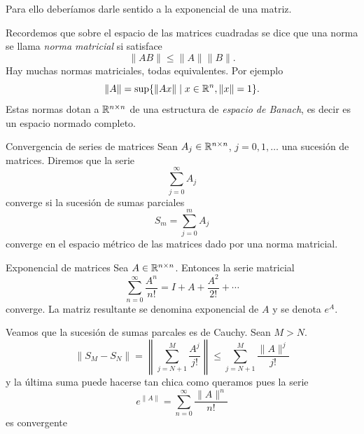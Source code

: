 Para ello deberíamos darle sentido a la exponencial de una matriz. 

Recordemos que sobre el espacio de las matrices cuadradas se dice que una norma se llama \emph{norma matricial} si satisface
\[    
  \|AB\|\leq \|A\|\|B\|.
\]
Hay muchas normas matriciales, todas equivalentes. Por ejemplo
\[
 \|A\|=\sup\{\|Ax\| \mid  x\in\mathbb{R}^n, \|x\|=1\}.
\]
Estas normas dotan a $\mathbb{R}^{n\times n}$ de una estructura de \emph{espacio de Banach}, es decir es un espacio normado completo. 



\begin{definicion}{Convergencia de series de matrices} Sean $A_j\in\mathbb{R}^{n\times n}$, $j=0,1,\ldots$ una sucesión de matrices. Diremos que la serie 
\[
 \sum_{j=0}^{\infty} A_j
\]
converge si la sucesión de sumas parciales
\[
 S_m=\sum_{j=0}^{m} A_j
\]
 converge en el espacio métrico de las matrices dado por una norma matricial. 
\end{definicion}


\begin{teorema}{Exponencial de matrices} Sea $A\in\mathbb{R}^{n\times n}$. Entonces  la serie matricial
\[
\sum_{n=0}^{\infty} \frac{A^n}{n!}=I+A+\frac{A^{2}}{2 !}+\cdots\]
converge. La matriz resultante se denomina exponencial de $A$ y se denota $e^A$.
\end{teorema}

\begin{demo} Veamos que la sucesión de sumas parcales es de Cauchy. Sean $M>N$. 
$$
\left\|S_{M}-S_{N}\right\|=\left\|\sum_{j=N+1}^{M} \frac{A^{j}}{j!}\right\| \leqslant \sum_{j=N+1}^{M} \frac{\| A \|^j}{j !}
$$
 y la última suma puede hacerse tan  chica como queramos pues la serie
 \[
  e^{\|A\|}=\sum_{n=0}^{\infty}\frac{\|A\|^n}{n!}
 \]
es convergente
\end{demo}


